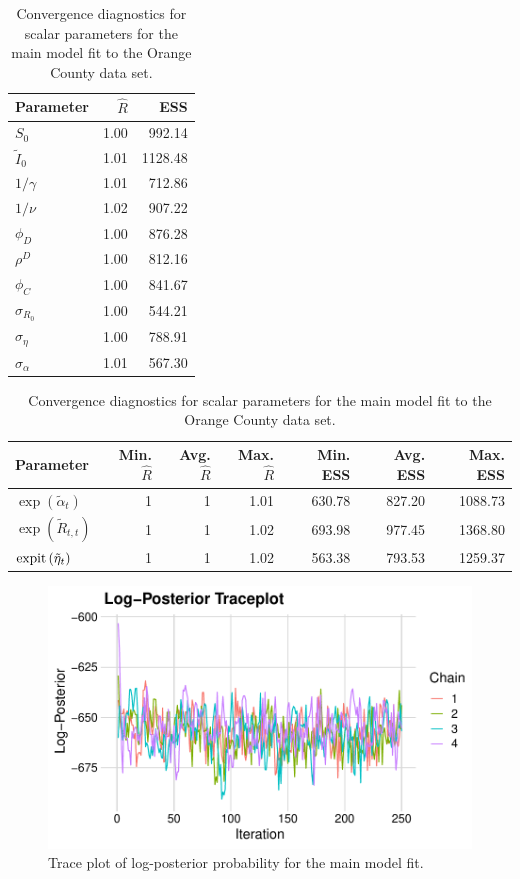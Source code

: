 \begin{table}

\caption{\label{ch_4:tab:univariate_diagnostics}Convergence diagnostics for scalar parameters for the main model fit to the Orange County data set.}
\centering
\begin{tabular}[t]{lrr}
\toprule
Parameter & $\hat{R}$ & ESS\\
\midrule
$S_0$ & 1.00 & 992.14\\
$\tilde{I}_{0}$ & 1.01 & 1128.48\\
$1 / \gamma$ & 1.01 & 712.86\\
$1 / \nu$ & 1.02 & 907.22\\
$\phi_D$ & 1.00 & 876.28\\
\addlinespace
$\rho^D$ & 1.00 & 812.16\\
$\phi_C$ & 1.00 & 841.67\\
$\sigma_{R_0}$ & 1.00 & 544.21\\
$\sigma_\eta$ & 1.00 & 788.91\\
$\sigma_\alpha$ & 1.01 & 567.30\\
\bottomrule
\end{tabular}
\end{table}

\begin{table}

\caption{\label{ch_4:tab:multivariate_diagnostics}Convergence diagnostics for scalar parameters for the main model fit to the Orange County data set.}
\centering
\begin{tabular}[t]{lrrrrrr}
\toprule
Parameter & Min. $\hat{R}$ & Avg. $\hat{R}$ & Max. $\hat{R}$ & Min. ESS & Avg. ESS & Max. ESS\\
\midrule
$\exp\left(\tilde{\alpha}_t\right)$ & 1 & 1 & 1.01 & 630.78 & 827.20 & 1088.73\\
$\exp\left(\tilde{R}_{t,t}\right)$ & 1 & 1 & 1.02 & 693.98 & 977.45 & 1368.80\\
$\operatorname{expit}\left(\tilde{\eta}_t\right)$ & 1 & 1 & 1.02 & 563.38 & 793.53 & 1259.37\\
\bottomrule
\end{tabular}
\end{table}

\begin{figure}[htbp]
    \centering
    \includegraphics[width=1.0\columnwidth]{lp_trace_plot}
    \caption{Trace plot of log-posterior probability for the main model fit.}
    \label{ch_4:fig:lp_trace_plot}
\end{figure}

